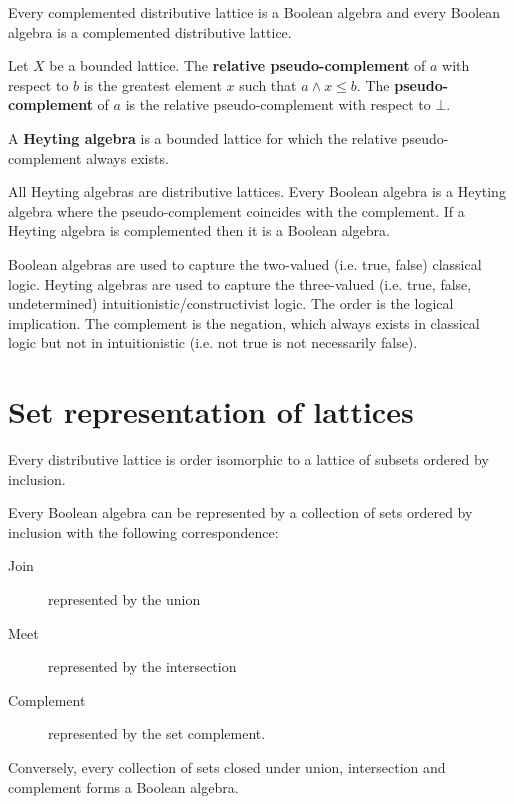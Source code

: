 \documentclass{article}
\newcommand{\marginleft}[1] {\reversemarginpar\marginpar{#1}}
\begin{document}
\begin{prop}
	Every complemented distributive lattice is a Boolean algebra and every Boolean algebra is a complemented distributive lattice.
\end{prop}

\begin{defn}
	Let $X$ be \marginleft{Pseudo-complement} a bounded lattice. The \textbf{relative pseudo-complement} of $a$ with respect to $b$ is the greatest element $x$ such that $a \wedge x \leq b$. The \textbf{pseudo-complement} of $a$ is the relative pseudo-complement with respect to $\bot$.
\end{defn}

\begin{defn}
	A \textbf{Heyting algebra} \marginleft{Heyting algebra} is a bounded lattice for which the relative pseudo-complement always exists.
\end{defn}

\begin{prop}
	All Heyting algebras are distributive lattices. Every Boolean algebra is a Heyting algebra where the pseudo-complement coincides with the complement. If a Heyting algebra is complemented then it is a Boolean algebra.
\end{prop}

\begin{remark}
	Boolean algebras are used to capture the two-valued (i.e. true, false) classical logic. Heyting algebras are used to capture the three-valued (i.e. true, false, undetermined) intuitionistic/constructivist logic. The order is the logical implication. The complement is the negation, which always exists in classical logic but not in intuitionistic (i.e. not true is not necessarily false).
\end{remark}

\section{Set representation of lattices}

\begin{prop}
	Every distributive lattice is order isomorphic to a lattice of subsets ordered by inclusion.
\end{prop}

\begin{prop}
	Every Boolean algebra can be represented by a collection of sets ordered by inclusion with the following correspondence:
	\begin{description}
		\item[Join] represented by the union
		\item[Meet] represented by the intersection
		\item[Complement] represented by the set complement.
	\end{description}
	Conversely, every collection of sets closed under union, intersection and complement forms a Boolean algebra.
\end{prop}
\end{document}
